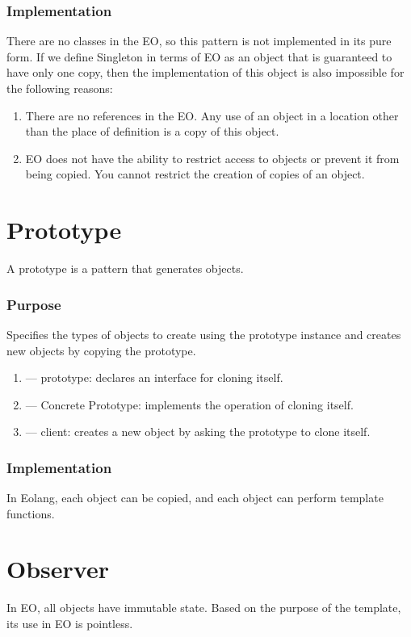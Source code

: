 \documentclass[12pt]{book}
\begin{document}
\subsubsection{Implementation}
There are no classes in the EO, so this pattern is not implemented in its pure form. If we define Singleton in  terms  of  EO as an object that is guaranteed to have only one copy, then the implementation of this object is also impossible for the following reasons:
\begin{enumerate}
    \item There are no references in the EO.  Any use of an object in a location other than the place of definition is a copy of this object.
    \item EO  does not have the ability to restrict access to objects or prevent it from being copied. You cannot restrict the creation of copies of an object.

\end{enumerate}

\section{Prototype}
A prototype is a pattern that generates objects.

\subsubsection{Purpose}
Specifies the types of objects to create using the prototype instance and creates new objects by copying the prototype.


\begin{enumerate}
    \item — prototype: declares an interface for cloning itself.
    \item — Concrete Prototype: implements the operation of cloning itself.
    \item  — client: creates a new object by asking the prototype to clone itself.
\end{enumerate}

\subsubsection{Implementation}
In Eolang, each object can be copied, and each object can perform template functions.

\section{Observer}
In EO, all objects have immutable state. Based on the purpose of the template, its use in EO is pointless.
\end{document}
